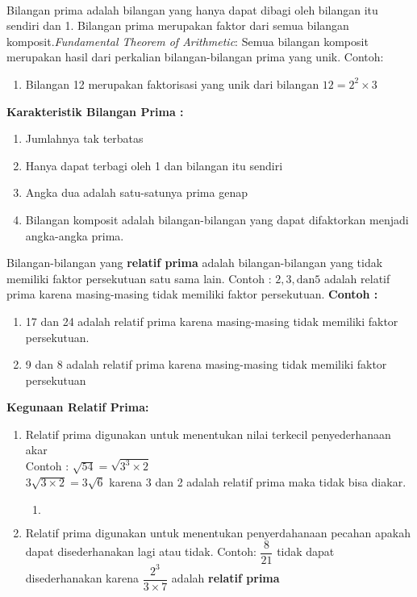 \paragraph*{}
	Bilangan prima adalah bilangan yang hanya dapat dibagi oleh bilangan itu sendiri dan 1. Bilangan prima merupakan faktor dari semua bilangan komposit.\textit{Fundamental Theorem of Arithmetic}: Semua bilangan komposit merupakan hasil dari perkalian bilangan-bilangan prima yang unik.
	Contoh:
	\begin{enumerate}
		\item Bilangan 12 merupakan faktorisasi yang unik dari bilangan $12=2^2\times 3$  
	\end{enumerate}
	\textbf{Karakteristik Bilangan Prima :}
	\begin{enumerate}
		\item Jumlahnya tak terbatas
		\item Hanya dapat terbagi oleh 1 dan bilangan itu sendiri
		\item Angka dua adalah satu-satunya prima genap
		\item Bilangan komposit adalah bilangan-bilangan yang dapat difaktorkan menjadi angka-angka prima.
	\end{enumerate}
	Bilangan-bilangan yang \textbf{relatif prima} adalah bilangan-bilangan yang tidak memiliki faktor persekutuan satu sama lain. Contoh : $2,3,\text{dan} 5$ adalah relatif prima karena masing-masing tidak memiliki faktor persekutuan.
	\textbf{Contoh :} 
	\begin{enumerate}
		\item 17 dan 24 adalah relatif prima karena masing-masing tidak memiliki faktor persekutuan.
		\item 9 dan 8  adalah relatif prima karena masing-masing tidak memiliki faktor persekutuan
	\end{enumerate}
	\textbf{Kegunaan Relatif Prima:}
	\begin{enumerate}
		\item Relatif prima digunakan untuk menentukan nilai terkecil penyederhanaan akar\\
		Contoh : $\sqrt{54}=\sqrt{3^3 \times 2}$\\
				 $3\sqrt{3\times 2}=3\sqrt{6} $ karena 3 dan 2 adalah relatif prima maka tidak bisa diakar.
		\begin{enumerate}
			\item $ $
		\end{enumerate}
		\item Relatif prima digunakan untuk menentukan penyerdahanaan pecahan apakah dapat disederhanakan lagi atau tidak. Contoh:  $\dfrac{8}{21}$ tidak dapat disederhanakan karena $\dfrac{2^3}{3\times 7}$ adalah \textbf{relatif prima}
	\end{enumerate}
	
